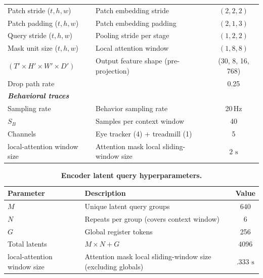 \documentclass{article} %
\begin{document}
\begin{table}[H]
\begin{tabular}{llc}
\quad\quad Patch stride ($t, h, w$) & Patch embedding stride & $(2, 2, 2)$ \\
\quad\quad Patch padding ($t, h, w$) & Patch embedding padding & $(2, 1, 3)$ \\
\quad\quad Query stride ($t, h, w$) & Pooling stride per stage & $(1, 2, 2)$ \\
\quad\quad Mask unit size ($t, h, w$) & Local attention window & $(1, 8, 8)$ \\
\quad\quad $(T' \times H' \times W' \times D')$ & Output feature shape (pre-projection) & (30, 8, 16, 768) \\
\quad\quad Drop path rate & & 0.25 \\
\midrule
\multicolumn{3}{l}{\textit{\textbf{Behavioral traces}}} \\
\quad Sampling rate & Behavior sampling rate & 20\,Hz \\
\quad $S_B$ & Samples per context window & 40 \\
\quad Channels & Eye tracker (4) + treadmill (1) & 5 \\
\quad local-attention window size & Attention mask local sliding-window size & $2 \text{ s}$ \\
\bottomrule
\end{tabular}
\end{table}

\begin{table}[H]
\centering
\caption{\textbf{Encoder latent query hyperparameters.}}
\label{tab:hparams_latents}
\vspace{4pt}
\small
\renewcommand{\arraystretch}{1.15}
\begin{tabular}{llc}
\toprule
\textbf{Parameter} & \textbf{Description} & \textbf{Value} \\
\midrule
$M$ & Unique latent query groups & 640 \\
$N$ & Repeats per group (covers context window) & 6 \\
$G$ & Global register tokens & 256 \\
Total latents & $M \times N + G$ & 4096 \\
local-attention window size & Attention mask local sliding-window size (excluding globals) & $.333  \text{ s}$ \\
\bottomrule
\end{tabular}
\end{table}
\end{document}
